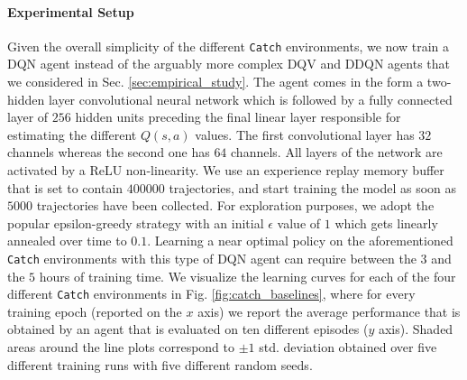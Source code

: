 \paragraph{Experimental Setup}
\label{sec:experimental_setup_control}
Given the overall simplicity of the different \texttt{Catch} environments, we now train a DQN agent instead of the arguably more complex DQV and DDQN agents that we considered in Sec. \ref{sec:empirical_study}. The agent comes in the form a two-hidden layer convolutional neural network which is followed by a fully connected layer of $256$ hidden units preceding the final linear layer responsible for estimating the different $Q(s,a)$ values. The first convolutional layer has $32$ channels whereas the second one has $64$ channels. All layers of the network are activated by a ReLU non-linearity. We use an experience replay memory buffer that is set to contain $400000$ trajectories, and start training the model as soon as $5000$ trajectories have been collected. For exploration purposes, we adopt the popular epsilon-greedy strategy with an initial $\epsilon$ value of $1$ which gets linearly annealed over time to $0.1$. Learning a near optimal policy on the aforementioned \texttt{Catch} environments with this type of DQN agent can require between the $3$ and the $5$ hours of training time. We visualize the learning curves for each of the four different \texttt{Catch} environments in Fig. \ref{fig:catch_baselines}, where for every training epoch (reported on the $x$ axis) we report the average performance that is obtained by an agent that is evaluated on ten different episodes ($y$ axis). Shaded areas around the line plots correspond to $\pm 1$ std. deviation obtained over five different training runs with five different random seeds.    

